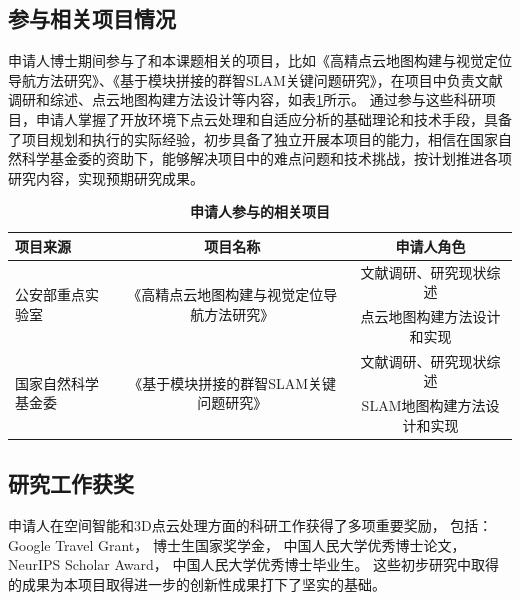 \documentclass[12pt]{article}
\begin{document}
\subsection{参与相关项目情况}

申请人博士期间参与了和本课题相关的项目，比如《高精点云地图构建与视觉定位导航方法研究》、《基于模块拼接的群智SLAM关键问题研究》，在项目中负责文献调研和综述、点云地图构建方法设计等内容，如表\ref{tab:related_projects}所示。
通过参与这些科研项目，申请人掌握了开放环境下点云处理和自适应分析的基础理论和技术手段，具备了项目规划和执行的实际经验，初步具备了独立开展本项目的能力，相信在国家自然科学基金委的资助下，能够解决项目中的难点问题和技术挑战，按计划推进各项研究内容，实现预期研究成果。

\begin{table}[ht]
   \centering
   \caption{\textbf{申请人参与的相关项目}}
   \scriptsize
   \begin{tabular}{l c c}
    \toprule
      \textbf{项目来源} & \textbf{项目名称} & \textbf{申请人角色} \\
      \midrule
      \multirow{2}{*}{公安部重点实验室} & \multirow{2}{*}{《高精点云地图构建与视觉定位导航方法研究》} & 文献调研、研究现状综述 \\
      & & 点云地图构建方法设计和实现 \\
      \midrule
      \multirow{2}{*}{国家自然科学基金委} & \multirow{2}{*}{《基于模块拼接的群智SLAM关键问题研究》} & 文献调研、研究现状综述 \\
      & & SLAM地图构建方法设计和实现 \\
    \bottomrule
    \end{tabular}
    \label{tab:related_projects}
\end{table}

\subsection{研究工作获奖}

申请人在空间智能和3D点云处理方面的科研工作获得了多项重要奖励，
包括：Google Travel Grant，
博士生国家奖学金，
中国人民大学优秀博士论文，
NeurIPS Scholar Award，
中国人民大学优秀博士毕业生。
这些初步研究中取得的成果为本项目取得进一步的创新性成果打下了坚实的基础。
\end{document}
